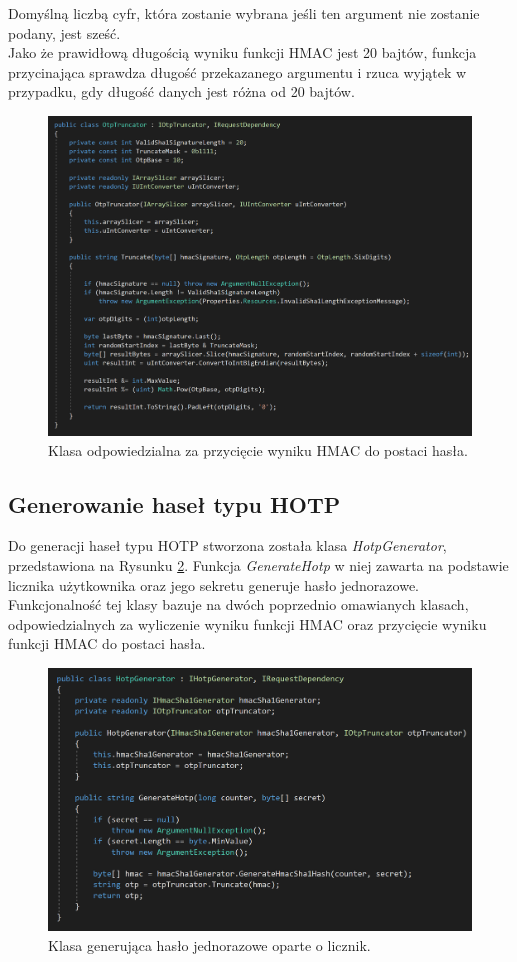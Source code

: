 Domyślną liczbą cyfr, która zostanie wybrana jeśli ten argument nie zostanie podany, jest sześć. \\
Jako że prawidłową długością wyniku funkcji HMAC jest 20 bajtów, funkcja przycinająca sprawdza 
długość przekazanego argumentu i rzuca wyjątek w przypadku, gdy długość danych jest różna od 20 bajtów.
\begin{figure}[t]
    \centering
	\includegraphics[width=\textwidth]{content/images/code-truncator}
    \caption{Klasa odpowiedzialna za przycięcie wyniku HMAC do postaci hasła.}
    \label{code-truncator}
\end{figure}

\subsection{Generowanie haseł typu HOTP}
Do generacji haseł typu HOTP stworzona została klasa \textit{HotpGenerator}, przedstawiona na Rysunku \ref{code-hotp}.
Funkcja \textit{GenerateHotp} w niej zawarta na podstawie licznika użytkownika oraz jego sekretu generuje hasło jednorazowe.
Funkcjonalność tej klasy bazuje na dwóch poprzednio omawianych klasach, odpowiedzialnych za wyliczenie wyniku funkcji HMAC oraz 
przycięcie wyniku funkcji HMAC do postaci hasła.
\begin{figure}[t]
    \centering
	\includegraphics[width=\textwidth]{content/images/code-hotpgenerator}
    \caption{Klasa generująca hasło jednorazowe oparte o licznik.}
    \label{code-hotp}
\end{figure}

